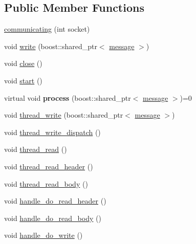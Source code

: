\subsection*{\-Public \-Member \-Functions}
\begin{DoxyCompactItemize}
\item 
\hyperlink{classgal_1_1network_1_1communicating_a151e8a718480e38a21ee0a953dc4b57f}{communicating} (int socket)
\item 
void \hyperlink{classgal_1_1network_1_1communicating_a388de6dcc741701cffaea874898643e6}{write} (boost\-::shared\-\_\-ptr$<$ \hyperlink{classgal_1_1network_1_1message}{message} $>$)
\item 
void \hyperlink{classgal_1_1network_1_1communicating_a3b39dcb940d746f44b6c2c72e198450d}{close} ()
\item 
void \hyperlink{classgal_1_1network_1_1communicating_a43bf55d2d11f1798b4814e069639a239}{start} ()
\item 
\hypertarget{classgal_1_1network_1_1communicating_aa9eb8cf91d093cbf9cd7293e8f10122e}{virtual void {\bfseries process} (boost\-::shared\-\_\-ptr$<$ \hyperlink{classgal_1_1network_1_1message}{message} $>$)=0}\label{classgal_1_1network_1_1communicating_aa9eb8cf91d093cbf9cd7293e8f10122e}

\item 
void \hyperlink{classgal_1_1network_1_1communicating_a271caa9e5d4d13fffda9d38218231b2c}{thread\-\_\-write} (boost\-::shared\-\_\-ptr$<$ \hyperlink{classgal_1_1network_1_1message}{message} $>$)
\item 
void \hyperlink{classgal_1_1network_1_1communicating_a32da51cf806bdc60b1a653ef20557af9}{thread\-\_\-write\-\_\-dispatch} ()
\item 
void \hyperlink{classgal_1_1network_1_1communicating_abd5efaa6563dda2097f69ae3679f87a1}{thread\-\_\-read} ()
\item 
void \hyperlink{classgal_1_1network_1_1communicating_aa7ef767d5117ba5d99cddcb1d7696a1d}{thread\-\_\-read\-\_\-header} ()
\item 
void \hyperlink{classgal_1_1network_1_1communicating_aeba5f8e491d9c6a4ddd75aa0a698bed9}{thread\-\_\-read\-\_\-body} ()
\item 
void \hyperlink{classgal_1_1network_1_1communicating_ab1434959e6a6b7311e7189078679124f}{handle\-\_\-do\-\_\-read\-\_\-header} ()
\item 
void \hyperlink{classgal_1_1network_1_1communicating_a383465f75d9d656a0e80ea3f57963630}{handle\-\_\-do\-\_\-read\-\_\-body} ()
\item 
void \hyperlink{classgal_1_1network_1_1communicating_a5a0d9fbfe61ff1d35380854d8aa3860e}{handle\-\_\-do\-\_\-write} ()
\end{DoxyCompactItemize}
